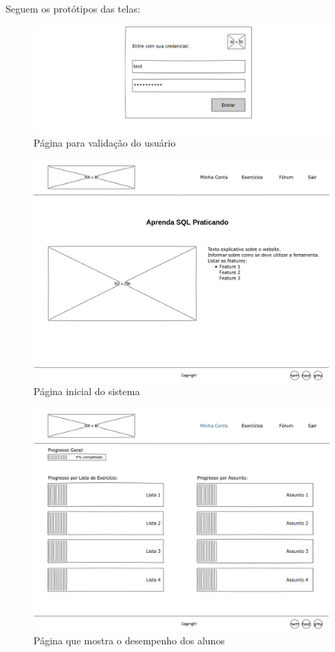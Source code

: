 \documentclass[graduacao,brazil]{ThesisPUC}
\begin{document}
Seguem os prot\'{o}tipos das telas:

\begin{figure}[H]
    \centering
    \includegraphics[width=\linewidth]{Imagens/LoginPage.png}
    \caption{P\'{a}gina para valida\c{c}\~{a}o do usu\'{a}rio}
\end{figure}

\begin{figure}[H]
    \centering
    \includegraphics[width=\linewidth]{Imagens/WelcomePage.png}
    \caption{P\'{a}gina inicial do sistema}
\end{figure}

\begin{figure}[H]
    \centering
    \includegraphics[width=\linewidth]{Imagens/BoardPage.png}
    \caption{P\'{a}gina que mostra o desempenho dos alunos}
\end{figure}
\end{document}
